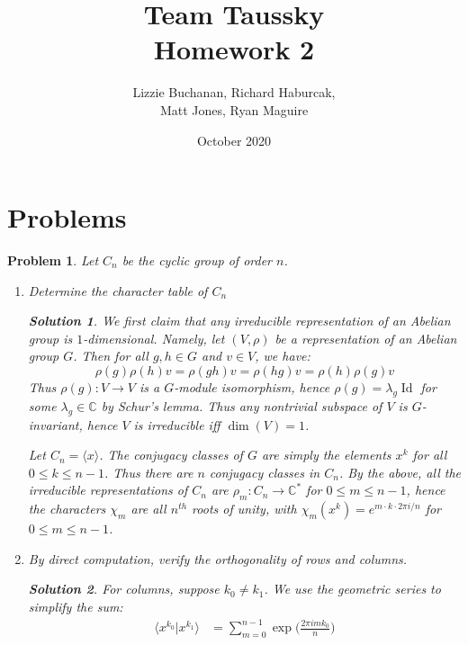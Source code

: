 \documentclass{article}
\title{Team Taussky\\ Homework 2}
\author{Lizzie Buchanan, Richard Haburcak,\\
        Matt Jones, Ryan Maguire}
\date{October 2020}
\theoremstyle{normal}
\newtheorem{problem}{Problem}
\theoremstyle{thmit}
\newtheorem*{solution}{Solution}
\begin{document}
\maketitle

\section{Problems}

\begin{problem}
    Let $C_n$ be the cyclic group of order $n$.
    \begin{enumerate}
        \item[(a)] Determine the character table of $C_n$
        \begin{solution}
            We first claim that any irreducible representation of an Abelian group is $1$-dimensional.
            Namely, let $(V,\rho)$ be a representation of an Abelian group $G$. Then for all $g,h\in G$
            and $v\in V$, we have:
            \begin{equation}
                \rho(g)\rho(h)v=\rho(gh)v=\rho(hg)v=\rho(h)\rho(g)v
            \end{equation}
            Thus $\rho(g):V\to{V}$ is a $G$-module isomorphism, hence $\rho(g)=\lambda_g\operatorname{Id}$
            for some $\lambda_g \in \mathbb{C}$ by Schur's lemma. Thus any nontrivial subspace of $V$ is
            $G$-invariant, hence $V$ is irreducible iff $\operatorname{dim}(V)=1$.
            \par
            Let $C_n = \langle x\rangle$. The conjugacy classes of $G$ are simply the elements $x^k$ for
            all $0\le k \le n-1$. Thus there are $n$ conjugacy classes in $C_n$. By the above, all the
            irreducible representations of $C_n$ are $\rho_m:C_n \to \mathbb{C}^\ast$ for $0\le m \le n-1$,
            hence the characters $\chi_m$ are all $n^{th}$ roots of unity, with
            $\chi_m(x^k)=e^{m\cdot k\cdot2\pi i/n}$ for $0\le m \le n-1$.
        \end{solution}
        \item[(b)] By direct computation, verify the orthogonality of rows and columns.
        \begin{solution}
            For columns, suppose $k_{0}\ne{k_{1}}$. We use the geometric series to simplify the sum:
            \begin{subequations}
                \begin{align}
                    \langle{x^{k_{0}}|x^{k_{1}}}\rangle&=
                        \sum_{m=0}^{n-1}\exp\big(\frac{2\pi{i}mk_{0}}{n}\big)

\end{align}
\end{subequations}
\end{solution}
\end{enumerate}
\end{problem}
\end{document}
